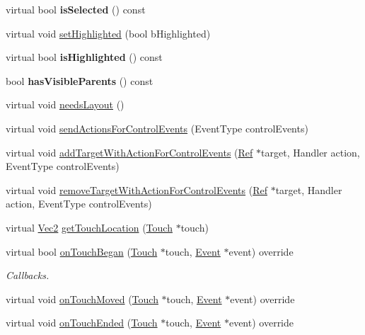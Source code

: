 \begin{DoxyCompactItemize}
virtual bool {\bfseries is\+Selected} () const
\item 
virtual void \hyperlink{classControl_a97602b469ae5f085cd604b9bf50732c3}{set\+Highlighted} (bool b\+Highlighted)
\item 
\mbox{\label{classControl_a02f19bf2478c4dfa658ec1af96018ee5}} 
virtual bool {\bfseries is\+Highlighted} () const
\item 
\mbox{\label{classControl_a9626a1e74663b29a5e7f92d9327d547d}} 
bool {\bfseries has\+Visible\+Parents} () const
\item 
virtual void \hyperlink{classControl_ac4ef8db3d2c65c2cd9c9c7c79c402b0a}{needs\+Layout} ()
\item 
virtual void \hyperlink{classControl_a5b70b945b2bdf48f7f42d9e53a675d90}{send\+Actions\+For\+Control\+Events} (Event\+Type control\+Events)
\item 
virtual void \hyperlink{classControl_af4a3ac51c41436945cc755532700f401}{add\+Target\+With\+Action\+For\+Control\+Events} (\hyperlink{classRef}{Ref} $\ast$target, Handler action, Event\+Type control\+Events)
\item 
virtual void \hyperlink{classControl_ac78a278c747454c5fa2db5039078dd1a}{remove\+Target\+With\+Action\+For\+Control\+Events} (\hyperlink{classRef}{Ref} $\ast$target, Handler action, Event\+Type control\+Events)
\item 
virtual \hyperlink{classVec2}{Vec2} \hyperlink{classControl_a226571b3103cb3289779243fee7f360b}{get\+Touch\+Location} (\hyperlink{classTouch}{Touch} $\ast$touch)
\item 
virtual bool \hyperlink{classControl_acdbc84186be785b6e2970c93f4252b72}{on\+Touch\+Began} (\hyperlink{classTouch}{Touch} $\ast$touch, \hyperlink{classEvent}{Event} $\ast$event) override
\begin{DoxyCompactList}\small\item\em Callbacks. \end{DoxyCompactList}\item 
virtual void \hyperlink{classControl_a98c8b1c7d2a15318ca720b5a398fbb14}{on\+Touch\+Moved} (\hyperlink{classTouch}{Touch} $\ast$touch, \hyperlink{classEvent}{Event} $\ast$event) override
\item 
virtual void \hyperlink{classControl_af31a373d40a3181e2a97f0f9dc85c1f8}{on\+Touch\+Ended} (\hyperlink{classTouch}{Touch} $\ast$touch, \hyperlink{classEvent}{Event} $\ast$event) override
\item 

\end{DoxyCompactItemize}
